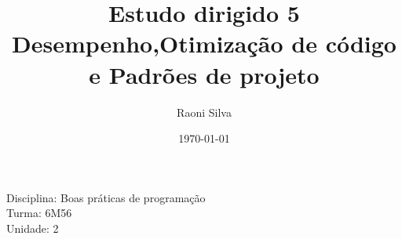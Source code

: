 \documentclass[a4paper,12pt]{article}
\title{Estudo dirigido 5 \\ Desempenho,Otimização de código e Padrões de projeto}
\author{Raoni Silva}
\date{\today}
\begin{document}
\maketitle

\noindent Disciplina: Boas práticas de programação \\ Turma: 6M56 \\ Unidade: 2


\newpage

\tableofcontents







\end{document}
